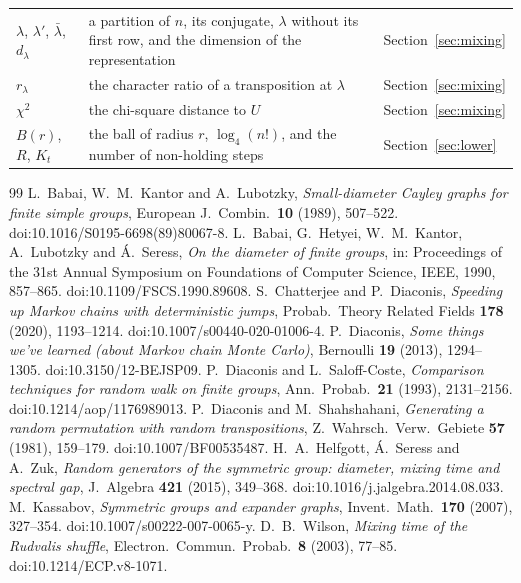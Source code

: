 \documentclass[11pt]{amsart}
\theoremstyle{remark}
\numberwithin{equation}{section}
\begin{document}
\begin{center}
\begin{tabular}{@{}lp{}l@{}}
$\lambda$, $\lambda'$, $\bar\lambda$, $d_\lambda$ & a partition of $n$, its conjugate, $\lambda$ without its first row, and the dimension of the representation & Section~\ref{sec:mixing} \\
$r_\lambda$ & the character ratio of a transposition at $\lambda$ & Section~\ref{sec:mixing} \\
$\chi^2$ & the chi-square distance to $U$ & Section~\ref{sec:mixing} \\
$B(r)$, $R$, $K_t$ & the ball of radius $r$, $\log_4(n!)$, and the number of non-holding steps & Section~\ref{sec:lower} \\
\bottomrule
\end{tabular}
\end{center}

\begin{thebibliography}{99}
 L.~Babai, W.~M.~Kantor and A.~Lubotzky, \emph{Small-diameter Cayley graphs for finite simple groups}, European J.\ Combin.\ \textbf{10} (1989), 507--522. doi:10.1016/S0195-6698(89)80067-8.
 L.~Babai, G.~Hetyei, W.~M.~Kantor, A.~Lubotzky and \'A.~Seress, \emph{On the diameter of finite groups}, in: Proceedings of the 31st Annual Symposium on Foundations of Computer Science, IEEE, 1990, 857--865. doi:10.1109/FSCS.1990.89608.
 S.~Chatterjee and P.~Diaconis, \emph{Speeding up Markov chains with deterministic jumps}, Probab.\ Theory Related Fields \textbf{178} (2020), 1193--1214. doi:10.1007/s00440-020-01006-4.
 P.~Diaconis, \emph{Some things we've learned (about Markov chain Monte Carlo)}, Bernoulli \textbf{19} (2013), 1294--1305. doi:10.3150/12-BEJSP09.
 P.~Diaconis and L.~Saloff-Coste, \emph{Comparison techniques for random walk on finite groups}, Ann.\ Probab.\ \textbf{21} (1993), 2131--2156. doi:10.1214/aop/1176989013.
 P.~Diaconis and M.~Shahshahani, \emph{Generating a random permutation with random transpositions}, Z.\ Wahrsch.\ Verw.\ Gebiete \textbf{57} (1981), 159--179. doi:10.1007/BF00535487.
 H.~A.~Helfgott, \'A.~Seress and A.~Zuk, \emph{Random generators of the symmetric group: diameter, mixing time and spectral gap}, J.\ Algebra \textbf{421} (2015), 349--368. doi:10.1016/j.jalgebra.2014.08.033.
 M.~Kassabov, \emph{Symmetric groups and expander graphs}, Invent.\ Math.\ \textbf{170} (2007), 327--354. doi:10.1007/s00222-007-0065-y.
 D.~B.~Wilson, \emph{Mixing time of the Rudvalis shuffle}, Electron.\ Commun.\ Probab.\ \textbf{8} (2003), 77--85. doi:10.1214/ECP.v8-1071.

\end{thebibliography}
\end{document}
